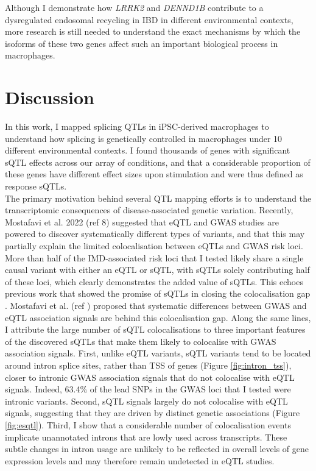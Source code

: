 Although I demonstrate how \textit{LRRK2} and \textit{DENND1B} contribute to a dysregulated endosomal recycling in IBD in different environmental contexts, more research is still needed to understand the exact mechanisms by which the isoforms of these two genes affect such an important biological process in macrophages. \\

\section{Discussion}

In this work, I mapped splicing QTLs in iPSC-derived macrophages to understand how splicing is genetically controlled in macrophages under 10 different environmental contexts. I found thousands of genes with significant sQTL effects across our array of conditions, and that a considerable proportion of these genes have different effect sizes upon stimulation and were thus defined as response sQTLs.\\

The primary motivation behind several QTL mapping efforts is to understand the transcriptomic consequences of disease-associated genetic variation. Recently, Mostafavi et al. 2022 (ref 8) suggested that eQTL and GWAS studies are powered to discover systematically different types of variants, and that this may partially explain the limited colocalisation between eQTLs and GWAS risk loci. More than half of the IMD-associated risk loci that I tested likely share a single causal variant with either an eQTL or sQTL, with sQTLs solely contributing half of these loci, which clearly demonstrates the added value of sQTLs. This echoes previous work that showed the promise of sQTLs in closing the colocalisation gap \cite{Mu2021-ar,Kim-Hellmuth2020-gz,Liu2018-fh}. Mostafavi et al. (ref \cite{Mostafavi2022-tg}) proposed that systematic differences between GWAS and eQTL association signals are behind this colocalisation gap. Along the same lines, I attribute the large number of sQTL colocalisations to three important features of the discovered sQTLs that make them likely to colocalise with GWAS association signals. First, unlike eQTL variants, sQTL variants tend to be located around intron splice sites, rather than TSS of genes (Figure \ref{fig:intron_tss}), closer to intronic GWAS association signals that do not colocalise with eQTL signals. Indeed, 63.4\% of the lead SNPs in the GWAS loci that I tested were intronic variants. Second, sQTL signals largely do not colocalise with eQTL signals, suggesting that they are driven by distinct genetic associations (Figure \ref{fig:esqtl}). Third, I show that a considerable number of colocalisation events implicate unannotated introns that are lowly used across transcripts. These subtle changes in intron usage are unlikely to be reflected in overall levels of gene expression levels and may therefore remain undetected in eQTL studies. \\


